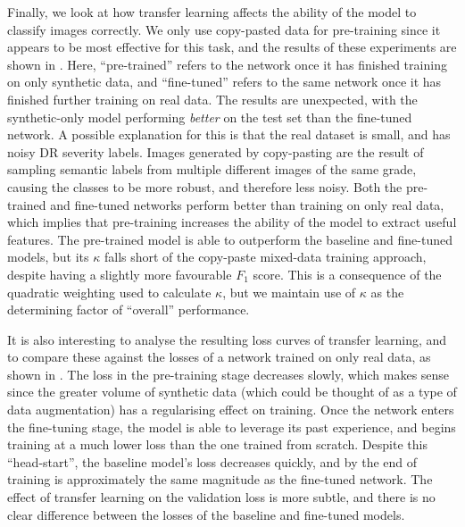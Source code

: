 Finally, we look at how transfer learning affects the ability of the model to classify images correctly.
We only use copy-pasted data for pre-training since it appears to be most effective for this task, and the results of these experiments are shown in .
Here, ``pre-trained'' refers to the network once it has finished training on only synthetic data, and ``fine-tuned'' refers to the same network once it has finished further training on real data.
The results are unexpected, with the synthetic-only model performing \emph{better} on the test set than the fine-tuned network.
A possible explanation for this is that the real dataset is small, and has noisy DR severity labels.
Images generated by copy-pasting are the result of sampling semantic labels from multiple different images of the same grade, causing the classes to be more robust, and therefore less noisy.
Both the pre-trained and fine-tuned networks perform better than training on only real data, which implies that pre-training increases the ability of the model to extract useful features.
The pre-trained model is able to outperform the baseline and fine-tuned models, but its $\kappa$ falls short of the copy-paste mixed-data training approach, despite having a slightly more favourable $F_1$ score.
This is a consequence of the quadratic weighting used to calculate $\kappa$, but we maintain use of $\kappa$ as the determining factor of ``overall'' performance.

It is also interesting to analyse the resulting loss curves of transfer learning, and to compare these against the losses of a network trained on only real data, as shown in .
The loss in the pre-training stage decreases slowly, which makes sense since the greater volume of synthetic data (which could be thought of as a type of data augmentation) has a regularising effect on training.
Once the network enters the fine-tuning stage, the model is able to leverage its past experience, and begins training at a much lower loss than the one trained from scratch.
Despite this ``head-start'', the baseline model's loss decreases quickly, and by the end of training is approximately the same magnitude as the fine-tuned network.
The effect of transfer learning on the validation loss is more subtle, and there is no clear difference between the losses of the baseline and fine-tuned models.

